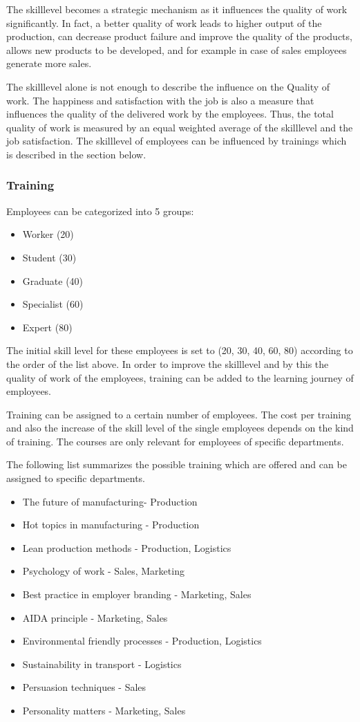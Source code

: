 The skilllevel becomes a strategic mechanism as it influences the quality of work significantly. In fact, a better quality of work leads to higher output of the production, can decrease product failure and improve the quality of the products, allows new products to be developed, and for example in case of sales employees generate more sales. 

The skilllevel alone is not enough to describe the influence on the Quality of work. The happiness and satisfaction with the job is also a measure that influences the quality of the delivered work by the employees.
Thus, the total quality of work is measured by an equal weighted average of the skilllevel and the job satisfaction. The skilllevel of employees can be influenced by trainings which is described in the section below.

\subsubsection{Training}
Employees can be categorized into 5 groups:
\begin{itemize}
    \item Worker (20)
    \item Student (30)
    \item Graduate (40)
    \item Specialist (60)
    \item Expert (80)
\end{itemize}
The initial skill level for these employees is set to (20, 30, 40, 60, 80) according to the order of the list above. In order to improve the skilllevel and by this the quality of work of the employees, training can be added to the learning journey of employees. 

Training can be assigned to a certain number of employees. The cost per training and also the increase of the skill level of the single employees depends on the kind of training. The courses are only relevant for employees of specific departments.

The following list summarizes the possible training which are offered and can be assigned to specific departments.
\begin{itemize}
\item The future of manufacturing- Production
\item Hot topics in manufacturing - Production
\item Lean production methods - Production, Logistics
\item Psychology of work - Sales, Marketing
\item Best practice in employer branding - Marketing, Sales
\item AIDA principle - Marketing, Sales
\item Environmental friendly processes - Production, Logistics
\item Sustainability in transport - Logistics
\item Persuasion techniques - Sales
\item Personality matters - Marketing, Sales
\end{itemize}


